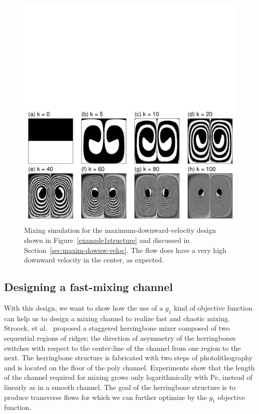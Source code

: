 \documentclass[times]{fldauth}
\begin{document}
\begin{figure}
  \centerline{
    \includegraphics[width=1\textwidth,trim=0cm 0.4cm 0cm 9cm,clip]{example1simu}
  }
  \caption{\label{example1simulation} Mixing simulation for the
    maximum-downward-velocity design shown in
    Figure~\ref{example1structure} and discussed in
    Section~\ref{sec:maxim-downw-veloc}. The flow does have a very
    high downward velocity in the center, as expected.}
\end{figure}

\subsection{Designing a fast-mixing channel }
\label{sec:mixing-channel}

With this design, we want to show how the use of a $g_1$ kind of
objective function can help us to design a mixing channel to realize
fast and chaotic mixing. Stroock, et al.\ \cite{Stroock2002} proposed
a staggered herringbone mixer composed of two sequential regions of
ridges; the direction of asymmetry of the herringbones switches with
respect to the center-line of the channel from one region to the next.
The herringbone structure is fabricated with two steps of
photolithography and is located on the floor of the poly channel.
Experiments show that the length of the channel required for mixing
grows only logarithmically with $\text{Pe}$, instead of linearly as in
a smooth channel. The goal of the herringbone structure is to produce
transverse flows for which we can further optimize by the $g_1$
objective function.
\end{document}
